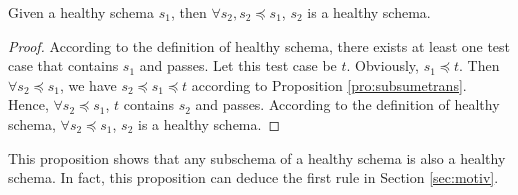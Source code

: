 \begin{proposition}\label{pro:subofhealthy}
Given a healthy schema $s_{1}$, then $\forall s_{2}, s_{2} \preceq s_{1}$, $s_{2}$ is a healthy schema.
\end{proposition}

\begin{proof}
According to the definition of healthy schema,  there exists at least one test case that contains $s_{1}$ and passes. Let this test case be $t$. Obviously, $s_{1} \preceq t$.  Then $\forall s_{2} \preceq  s_{1}$, we have $s_{2} \preceq s_{1} \preceq t$ according to Proposition \ref{pro:subsumetrans}. Hence, $\forall s_{2} \preceq  s_{1}$,  $t$ contains $s_{2}$ and passes. According to the definition of healthy schema, $\forall s_{2} \preceq  s_{1}$, $s_{2}$ is a healthy schema.
\end{proof}

This proposition shows that any subschema of a healthy schema is also a healthy schema. In fact, this proposition can deduce the first rule in Section \ref{sec:motiv}.


%
%
%
%
%

